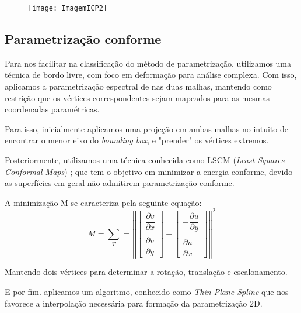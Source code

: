 \begin{figure}[h]
\center
    \texttt{[image: ImagemICP2]}
        \label{ICP}
\end{figure}
\vspace{4mm}

\subsection{Parametrização conforme}

Para nos facilitar na classificação do método de parametrização, utilizamos uma técnica de bordo livre, com foco em deformação para análise complexa. Com isso, aplicamos a parametrização espectral de \cite{Mullen} nas duas malhas, mantendo como restrição que os vértices correspondentes sejam mapeados para as mesmas coordenadas paramétricas.

Para isso, inicialmente aplicamos uma projeção em ambas malhas no intuito de encontrar o menor eixo do \textit{bounding box}, e "prender" os vértices extremos.
 
Posteriormente, utilizamos uma técnica conhecida como LSCM (\textit{Least Squares Conformal Maps}) \cite{Levy:2002}; que tem o objetivo em minimizar a energia conforme, devido as superfícies em geral não admitirem parametrização conforme.

A minimização M se caracteriza pela seguinte equação:
\[ M = \sum_{T}= \left|\left| \left[ \begin{array}{c}  \dfrac{\partial v}{\partial x} \\ \\  \dfrac{\partial v}{\partial y}  \end{array} \right] - \left[ \begin{array}{c}  -\dfrac{\partial u}{\partial y}  \\ \\ \dfrac{\partial u}{\partial x}  \end{array} \right] \right| \right|^{2} \]
\vspace*{0.3mm}

Mantendo dois vértices para determinar a rotação, translação e escalonamento.

E por fim. aplicamos um algoritmo, conhecido como \textit{Thin Plane Spline} \cite{Duchon} que nos favorece a interpolação necessária para formação da parametrização 2D.
%


